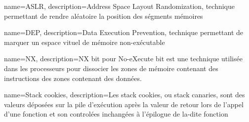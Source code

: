 


{
	name=ASLR,
	description={Address Space Layout Randomization, technique permettant de rendre aléatoire la position des ségments mémoires}
}

{
	name=DEP,
	description={Data Execution Prevention, technique permettant de marquer un espace vituel de mémoire non-exécutable}
}

{
	name=NX,
	description={NX bit pour No-eXecute bit est une technique utilisée dans les processeurs pour dissocier les zones de mémoire contenant des instructions des zones contenant des données.}
}

{
	name={Stack cookies},
	description={Les stack cookies, ou stack canaries, sont des valeurs déposées sur la pile d'exécution après la valeur de retour lors de l'appel d'une fonction et son controlées inchangées à l'épilogue de la-dite fonction}
}





